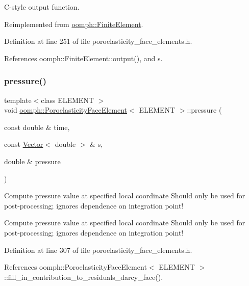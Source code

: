 C-\/style output function. 



Reimplemented from \hyperlink{classoomph_1_1FiniteElement_adfaee690bb0608f03320eeb9d110d48c}{oomph\+::\+Finite\+Element}.



Definition at line 251 of file poroelasticity\+\_\+face\+\_\+elements.\+h.



References oomph\+::\+Finite\+Element\+::output(), and s.

\mbox{\label{classoomph_1_1PoroelasticityFaceElement_af0ecc8b5c372d479f9ba46892a21e955}} 
\subsubsection{\texorpdfstring{pressure()}{pressure()}}
{\footnotesize\ttfamily template$<$class E\+L\+E\+M\+E\+NT $>$ \\
void \hyperlink{classoomph_1_1PoroelasticityFaceElement}{oomph\+::\+Poroelasticity\+Face\+Element}$<$ E\+L\+E\+M\+E\+NT $>$\+::pressure (\begin{DoxyParamCaption}\item[{const double \&}]{time,  }\item[{const \hyperlink{classoomph_1_1Vector}{Vector}$<$ double $>$ \&}]{s,  }\item[{double \&}]{pressure }\end{DoxyParamCaption})}



Compute pressure value at specified local coordinate Should only be used for post-\/processing; ignores dependence on integration point! 

Compute pressure value at specified local coordinate Should only be used for post-\/processing; ignores dependence on integration point! 

Definition at line 307 of file poroelasticity\+\_\+face\+\_\+elements.\+h.



References oomph\+::\+Poroelasticity\+Face\+Element$<$ E\+L\+E\+M\+E\+N\+T $>$\+::fill\+\_\+in\+\_\+contribution\+\_\+to\+\_\+residuals\+\_\+darcy\+\_\+face().

